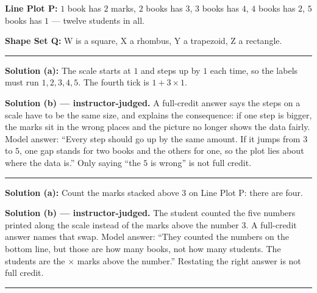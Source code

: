 \documentclass[12pt]{article}
\begin{document}


\noindent\textbf{Line Plot P:} $1$ book has $2$ marks, $2$ books has $3$, $3$ books has $4$,
$4$ books has $2$, $5$ books has $1$ --- twelve students in all.\par
\noindent\textbf{Shape Set Q:} W is a square, X a rhombus, Y a trapezoid, Z a rectangle.

\vspace{0.15cm}\noindent\rule{\linewidth}{0.4pt}


\textbf{Solution (a):} The scale starts at $1$ and steps up by $1$ each time, so the labels must run
$1, 2, 3, 4, 5$. The fourth tick is $1 + 3 \times 1$. 

\textbf{Solution (b) --- instructor-judged.} A full-credit answer says the steps on a scale have to be
the same size, and explains the consequence: if one step is bigger, the marks sit in the wrong places
and the picture no longer shows the data fairly. Model answer: ``Every step should go up by the same
amount. If it jumps from $3$ to $5$, one gap stands for two books and the others for one, so the plot
lies about where the data is.'' Only saying ``the $5$ is wrong'' is not full credit.

\vspace{0.15cm}\noindent\rule{\linewidth}{0.2pt}


\textbf{Solution (a):} Count the marks stacked above $3$ on Line Plot P: there are four. 

\textbf{Solution (b) --- instructor-judged.} The student counted the five numbers printed along the
scale instead of the marks above the number $3$. A full-credit answer names that swap. Model answer:
``They counted the numbers on the bottom line, but those are how many books, not how many students.
The students are the $\times$ marks above the number.'' Restating the right answer is not full credit.

\vspace{0.15cm}\noindent\rule{\linewidth}{0.2pt}

\end{document}
